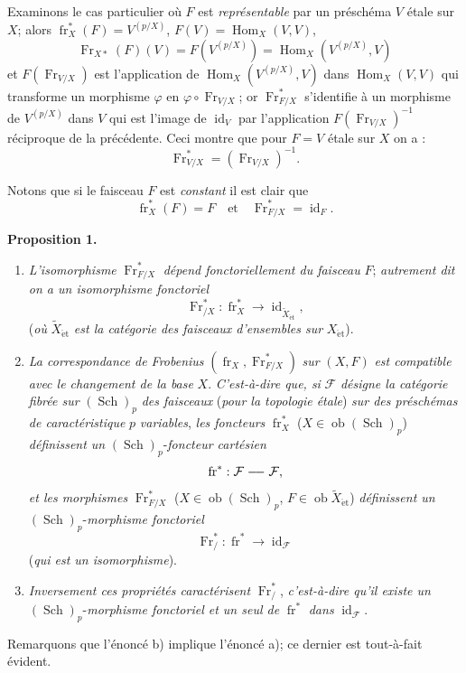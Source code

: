 \documentclass[11pt]{article}
\newenvironment{statement}[1]{\par\medskip\noindent\textbf{#1.}\ }{\par\medskip}
\DeclareMathOperator{\Hom}{Hom}
\providecommand{\et}{\mathrm{\acute{e}t}}
\providecommand{\id}{\operatorname{id}}
\providecommand{\Ob}{\operatorname{ob}}
\providecommand{\Hom}{\operatorname{Hom}}
\providecommand{\id}{\operatorname{id}}
\providecommand{\id}{\operatorname{id}}
\providecommand{\Ob}{\operatorname{ob}}
\providecommand{\id}{\operatorname{id}}
\providecommand{\id}{\operatorname{id}}
\providecommand{\Ob}{\operatorname{Ob}}
\providecommand{\Hom}{\operatorname{Hom}}
\providecommand{\Ob}{\operatorname{ob}}
\providecommand{\fr}{\operatorname{fr}}
\providecommand{\Fr}{\operatorname{Fr}}
\providecommand{\Sch}{\operatorname{Sch}}
\providecommand{\Fr}{\operatorname{Fr}}
\providecommand{\fr}{\operatorname{fr}}
\providecommand{\Sch}{\operatorname{Sch}}
\providecommand{\id}{\operatorname{id}}
\providecommand{\Ob}{\operatorname{Ob}}
\providecommand{\et}{\acute{e}t}
\begin{document}
Examinons le cas particulier où $F$ est \emph{représentable} par un préschéma $V$ étale sur $X$; alors $\fr_X^*(F)=V^{(p/X)}$, $F(V)=\Hom_X(V,V)$,
\[
\Fr_{X*}(F)(V)=F(V^{(p/X)})=\Hom_X(V^{(p/X)},V)
\]
et $F(\Fr_{V/X})$ est l'application de $\Hom_X(V^{(p/X)},V)$ dans $\Hom_X(V,V)$ qui transforme un morphisme $\varphi$ en $\varphi\circ\Fr_{V/X}$; or $\Fr^*_{F/X}$ s'identifie à un morphisme de $V^{(p/X)}$ dans $V$ qui est l'image de $\id_V$ par l'application $F(\Fr_{V/X})^{-1}$ réciproque de la précédente. Ceci montre que pour $F=V$ étale sur $X$ on a :
\[
\Fr^*_{V/X}=(\Fr_{V/X})^{-1}.
\]

Notons que si le faisceau $F$ est \emph{constant} il est clair que
\[
\fr_X^*(F)=F
\quad\text{et}\quad
\Fr^*_{F/X}=\id_F.
\]

\begin{statement}{Proposition 1}
\begin{enumerate}[label=\alph*)]
\item \emph{L'isomorphisme} $\Fr^*_{F/X}$ \emph{dépend fonctoriellement du faisceau} $F$; \emph{autrement dit on a un isomorphisme fonctoriel}
\[
\Fr^*_{/X}:\fr_X^*\longrightarrow \id_{\widetilde X_{\et}},
\]
(\emph{où} $\widetilde X_{\et}$ \emph{est la catégorie des faisceaux d'ensembles sur} $X_{\et}$).
\item \emph{La correspondance de Frobenius} $(\fr_X,\Fr^*_{F/X})$ \emph{sur} $(X,F)$ \emph{est compatible avec le changement de la base} $X$. \emph{C'est-à-dire que, si} $\mathcal F$ \emph{désigne la catégorie fibrée sur} $(\Sch)_p$ \emph{des faisceaux} (\emph{pour la topologie étale}) \emph{sur des préschémas de caractéristique} $p$ \emph{variables}, \emph{les foncteurs} $\fr_X^*$ ($X\in\Ob(\Sch)_p$) \emph{définissent un} $(\Sch)_p$-\emph{foncteur cartésien}
\[
\fr^*: \mathcal F\relbar\joinrel\relbar\mathcal F,
\]
\emph{et les morphismes} $\Fr^*_{F/X}$ ($X\in\Ob(\Sch)_p$, $F\in\Ob\widetilde X_{\et}$) \emph{définissent un} $(\Sch)_p$-\emph{morphisme fonctoriel}
\[
\Fr^*_{/}:\fr^*\longrightarrow\id_{\mathcal F}
\]
(\emph{qui est un isomorphisme}).
\item \emph{Inversement ces propriétés caractérisent} $\Fr^*_{/}$, \emph{c'est-à-dire qu'il existe un} $(\Sch)_p$-\emph{morphisme fonctoriel et un seul de} $\fr^*$ \emph{dans} $\id_{\mathcal F}$.
\end{enumerate}
\end{statement}

Remarquons que l'énoncé b) implique l'énoncé a); ce dernier est tout-à-fait évident.
\end{document}
